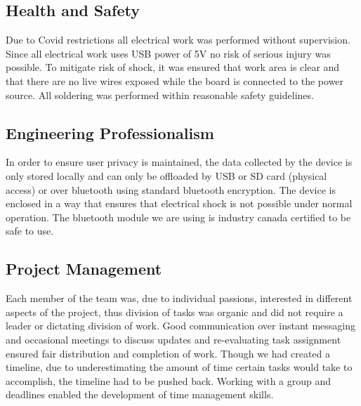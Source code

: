 \subsection{Health and Safety}
Due to Covid restrictions all electrical work was performed without supervision.  
Since all electrical work uses USB power of 5V no risk of serious injury was possible.
To mitigate risk of shock, it was ensured that work area is clear and that there are no live wires exposed while the board is connected to the power source.
All soldering was performed within reasonable safety guidelines.

\subsection{Engineering Professionalism}
In order to ensure user privacy is maintained, the data collected by the device is only stored locally and
can only be offloaded by USB or SD card (physical access) or over bluetooth using standard bluetooth encryption.
The device is enclosed in a way that ensures that electrical shock is not possible under normal operation.
The bluetooth module we are using is industry canada certified to be safe to use.

\subsection{Project Management}
Each member of the team was, due to individual passions, interested in different
aspects of the project, thus division of tasks was organic and did not require a leader or dictating division of work.
Good communication over instant messaging and occasional meetings to discuss updates and re-evaluating
task assignment ensured fair distribution and completion of work.
Though we had created a timeline,
due to underestimating the amount of time certain tasks would take to
accomplish, the timeline had to be pushed back. Working with a group and
deadlines enabled the development of time management skills.


